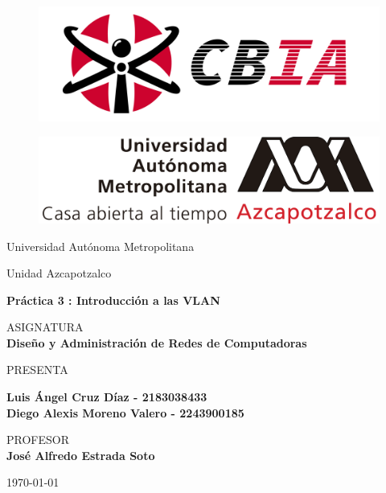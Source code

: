 
\begin{figure}[ht]
    \centering %
    \begin{minipage}{0.45\textwidth} %
        \includegraphics[width=\textwidth]{img/portada/CBI.png}
        \label{CBI}
    \end{minipage}\hfill %
    \begin{minipage}{0.45\textwidth}
        \includegraphics[width=\textwidth]{img/portada/UAM.png}
        \label{UAM}
    \end{minipage}
\end{figure}


\begin{center}
\vspace{0.8cm}
\LARGE
Universidad Autónoma Metropolitana

\vspace{0.8cm}
\LARGE
Unidad Azcapotzalco

\vspace{1.7cm}
\Large
\textbf{Práctica 3 : Introducción a las VLAN}

\vspace{1.3cm}
\normalsize	
ASIGNATURA \\
\vspace{.3cm}
\large
\textbf{Diseño y Administración de Redes de Computadoras}

\vspace{1.3cm}
\normalsize
PRESENTA \\
\vspace{.3cm}
\large

\textbf{Luis Ángel Cruz Díaz - 2183038433\\}
\textbf{Diego Alexis Moreno Valero - 2243900185}

\vspace{1.3cm}
\normalsize	
PROFESOR \\
\vspace{.3cm}
\large
\textbf{José Alfredo Estrada Soto} 

\vspace{1.3cm}
\today
\end{center}

\thispagestyle{empty} 
\newpage